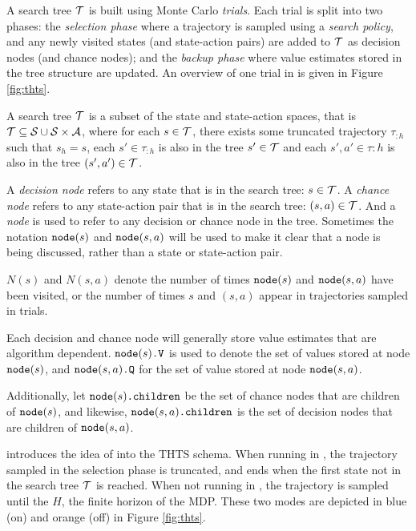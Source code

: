         A search tree $\mathcal{T}$ is built using Monte Carlo \textit{trials}. Each trial is split into two phases: the \textit{selection phase} where a trajectory is sampled using a \textit{search policy}, and any newly visited states (and state-action pairs) are added to $\mathcal{T}$ as decision nodes (and chance nodes); and the \textit{backup phase} where value estimates stored in the tree structure are updated. An overview of one trial in \thtspp\ewe is given in Figure \ref{fig:thts}.

        \begin{defn}
            \label{def:search_tree}
            A \textnormal{search tree} $\mathcal{T}$ is a subset of the state and state-action spaces, that is $\mathcal{T}\subseteq \mathcal{S} \cup \mathcal{S} \times \mathcal{A}$, where for each $s\in\mathcal{T}$, there exists some truncated trajectory $\tau_{:h}$ such that $s_h = s$, each $s'\in\tau_{:h}$ is also in the tree $s'\in\mathcal{T}$ and each $s',a'\in\tau{:h}$ is also in the tree $(s',a')\in\mathcal{T}$.
        \end{defn}

            A \textit{decision node} refers to any state that is in the search tree: $s\in\mathcal{T}$. A \textit{chance node} refers to any state-action pair that is in the search tree: $(s,a)\in\mathcal{T}$. And a \textit{node} is used to refer to any decision or chance node in the tree. Sometimes the notation ${\textnormal{\texttt{node}}}(s)$ and ${\textnormal{\texttt{node}}}(s,a)$ will be used to make it clear that a node is being discussed, rather than a state or state-action pair.

            $N(s)$ and $N(s,a)$ denote the number of times ${\textnormal{\texttt{node}}}(s)$ and ${\textnormal{\texttt{node}}}(s,a)$ have been visited, or the number of times $s$ and $(s,a)$ appear in trajectories sampled in \thtspp\ewe trials.

            Each decision and chance node will generally store value estimates that are algorithm dependent. ${{\textnormal{\texttt{node}}}(s)\textnormal{\texttt{.V}}}$ is used to denote the set of values stored at node ${\textnormal{\texttt{node}}}(s)$, and ${{\textnormal{\texttt{node}}}(s,a)\textnormal{\texttt{.Q}}}$ for the set of value stored at node ${\textnormal{\texttt{node}}}(s,a)$. 

            Additionally, let ${\textnormal{\texttt{node}}}(s){\textnormal{\texttt{.children}}}$ be the set of chance nodes that are children of ${\textnormal{\texttt{node}}}(s)$, and likewise, ${\textnormal{\texttt{node}}}(s,a){\textnormal{\texttt{.children}}}$ is the set of decision nodes that are children of ${\textnormal{\texttt{node}}}(s,a)$.

        \thtspp\ewe introduces the idea of \mctsmode\ewe into the THTS schema. When running in \mctsmode, the trajectory sampled in the selection phase is truncated, and ends when the first state not in the search tree $\mathcal{T}$ is reached. When not running in \mctsmode, the trajectory is sampled until the $H$, the finite horizon of the MDP. These two modes are depicted in blue (\mctsmode\ewe on) and orange (\mctsmode\ewe off) in Figure \ref{fig:thts}. 


